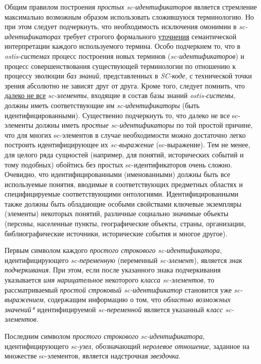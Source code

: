 Общим правилом построения \textit{простых sc-идентификаторов} является стремление максимально возможным образом использовать сложившуюся терминологию. Но при этом следует подчеркнуть, что необходимость исключения омонимии в \textit{sc-идентификаторах} требует строгого формального \uline{уточнения} семантической интерпретации каждого используемого термина. Особо подчеркнем то, что в \textit{ostis-системах} процесс построения новых терминов (\textit{sc-идентификаторов}) и процесс совершенствования существующей терминологии по отношению к процессу эволюции \textit{баз знаний}, представленных в \textit{SC-коде}, с технической точки зрения абсолютно не зависят друг от друга. Кроме того, следует помнить, что \uline{далеко не все} \textit{sc-элементы}, входящие в состав базы знаний \textit{ostis-системы}, должны иметь соответствующие им \textit{sc-идентификаторы} (быть идентифицированными). Существенно подчеркнуть то, что далеко не все sc-элементы должны иметь \textit{простые sc-идентификаторы} по той простой причине, что для многих sc-элементов в случае необходимости можно достаточно легко построить идентифицирующее их \textit{sc-выражение} (sc-выражение). Тем не менее, для целого ряда сущностей (например, для понятий, исторических событий и тому подобных) обойтись без простых sc-идентификаторов очень сложно. Очевидно, что идентифицированными (именованными) должны быть все используемые понятия, вводимые в соответствующих предметных областях и специфицируемые соответствующими онтологиями. Идентифицированными также должны быть обладающие особыми свойствами ключевые экземпляры (элементы) некоторых понятий, различные социально значимые объекты (персоны, населенные пункты, географические объекты, страны, организации, библиографические источники, исторические события и многое другое).

Первым символом каждого \textit{простого строкового sc-идентификатора}, идентифицирующего \textit{sc-переменную} (переменный \textit{sc-элемент}), является \textit{знак подчеркивания}. При этом, если после указанного знака подчеркивания указывается \textit{имя нарицательное} некоторого \textit{класса sc-элементов}, то рассматриваемый \textit{простой строковый sc-идентификатор} становится уже \textit{sc-выражением}, содержащим информацию о том, что \textit{областью возможных значений*} идентифицируемой \textit{sc-переменной} является указанный \textit{класс sc-элементов}.

Последним символом \textit{простого строкового sc-идентификатора}, идентифицирующего \textit{sc-узел}, обозначающий \textit{неролевое отношение}, заданное на множестве sc-элементов, является надстрочная \textit{звездочка}.

